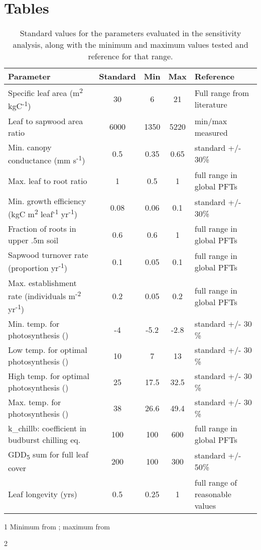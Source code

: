 \documentclass[]{article}
\title{}
\author{}
\begin{document}
	
\section{Tables}

\begin{table}[ht]
	\begin{threeparttable}
	\caption{Standard values for the parameters evaluated in the sensitivity analysis, along with the minimum and maximum values tested and reference for that range.} 
	\begin{tabular}{lcccl}
		\toprule
		Parameter & Standard & Min & Max & Reference \\ 
		\midrule
		Specific leaf area (m\textsuperscript{2} kgC\textsuperscript{-1}) & 30 & 6 & 21 & Full range from literature\tnote1 \\
		Leaf to sapwood area ratio & 6000 & 1350 & 5220 & min/max measured\tnote2 \\
		Min. canopy conductance (mm s\textsuperscript{-1}) & 0.5 & 0.35 & 0.65 & standard +/- 30\% \\
		Max. leaf to root ratio & 1 & 0.5 & 1 & full range in global PFTs \\
		Min. growth efficiency (kgC m\textsuperscript{2} leaf\textsuperscript{-1} yr\textsuperscript{-1}) & 0.08 & 0.06 & 0.1 & standard +/- 30\% \\
		Fraction of roots in upper .5m soil & 0.6 & 0.6 & 1 & full range in global PFTs \\
		Sapwood turnover rate (proportion yr\textsuperscript{-1}) & 0.1 & 0.05 & 0.1 & full range in global PFTs \\
		Max. establishment rate (individuals m\textsuperscript{-2} yr\textsuperscript{-1}) & 0.2 & 0.05 & 0.2 & full range in global PFTs \\
		Min. temp. for photosynthesis (\celsius) & -4 & -5.2 & -2.8 & standard +/- 30 \% \\
		Low temp. for optimal photosynthesis (\celsius) & 10 & 7 & 13 & standard +/- 30 \% \\
		High temp. for optimal photosynthesis (\celsius) & 25 & 17.5 & 32.5 & standard +/- 30 \% \\
		Max. temp. for photosynthesis (\celsius) & 38 & 26.6 & 49.4 & standard +/- 30 \% \\
		k\_chillb: coefficient in budburst chilling eq. & 100 & 100 & 600 & full range in global PFTs \\
		GDD\textsubscript{5} sum for full leaf cover & 200 & 100 & 300 & standard +/- 50\% \\
		Leaf longevity (yrs) & 0.5 & 0.25 & 1 & full range of reasonable values \\
	\bottomrule
	\end{tabular}
\begin{tablenotes}
	\item[1] Minimum from \citet{Olsoy2016}; maximum from \citet{Ganskopp1986}
	\item[2] \citet{Ganskopp1986}
\end{tablenotes}
\end{threeparttable}
\end{table}
\end{document}
